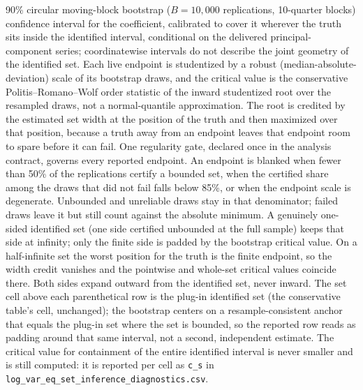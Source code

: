 \documentclass[11pt]{article}
\begin{document}
\begin{table}[!htbp]
\begin{threeparttable}
\begin{tablenotes}[flushleft]
90\% circular moving-block bootstrap ($B=10{,}000$ replications, 10-quarter blocks) confidence interval for the coefficient, calibrated to cover it wherever the truth sits inside the identified interval, conditional on the delivered principal-component series; coordinatewise intervals do not describe the joint geometry of the identified set. Each live endpoint is studentized by a robust (median-absolute-deviation) scale of its bootstrap draws, and the critical value is the conservative Politis--Romano--Wolf order statistic of the inward studentized root over the resampled draws, not a normal-quantile approximation. The root is credited by the estimated set width at the position of the truth and then maximized over that position, because a truth away from an endpoint leaves that endpoint room to spare before it can fail. One regularity gate, declared once in the analysis contract, governs every reported endpoint. An endpoint is blanked when fewer than 50\% of the replications certify a bounded set, when the certified share among the draws that did not fail falls below 85\%, or when the endpoint scale is degenerate. Unbounded and unreliable draws stay in that denominator; failed draws leave it but still count against the absolute minimum. A genuinely one-sided identified set (one side certified unbounded at the full sample) keeps that side at infinity; only the finite side is padded by the bootstrap critical value. On a half-infinite set the worst position for the truth is the finite endpoint, so the width credit vanishes and the pointwise and whole-set critical values coincide there. Both sides expand outward from the identified set, never inward. The set cell above each parenthetical row is the plug-in identified set (the conservative table's cell, unchanged); the bootstrap centers on a resample-consistent anchor that equals the plug-in set where the set is bounded, so the reported row reads as padding around that same interval, not a second, independent estimate. The critical value for containment of the entire identified interval is never smaller and is still computed: it is reported per cell as \texttt{c\_s} in \texttt{log\_var\_eq\_set\_inference\_diagnostics.csv}.
\end{tablenotes}
\end{threeparttable}
\end{table}
\clearpage
\end{document}
